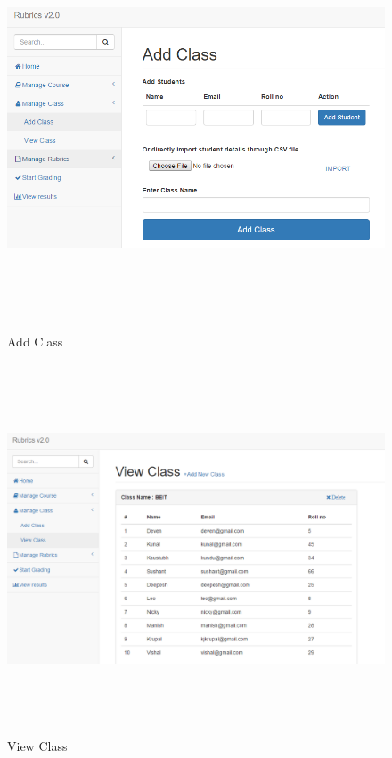\begin{figure}[!h]

\begin{minipage}[t]{0.5\linewidth}
    \centering
\hfill\includegraphics[width=17cm, height=12cm]{project/14}\hspace*{\fill}
    \caption{Add Class}
    \label{f1}
\end{minipage}        
\end{figure}

\begin{figure}[!h]
\begin{minipage}[t]{0.5\linewidth}
    \centering
\hfill\includegraphics[width=17cm, height=11cm]{project/15}\hspace*{\fill}
    \caption{View Class}
    \label{f1}
\end{minipage}        
\end{figure}

